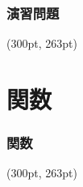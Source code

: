 \documentclass[dvipdfmx]{beamer}
\begin{document}
\begin{frame}[t, fragile]
    \frametitle{演習問題}
    \begin{textblock*}{0.3\linewidth}(300pt, 263pt)
    \space
    \end{textblock*}
\end{frame}

\section{関数}
\begin{frame}[t, fragile]
    \frametitle{関数}
    \tableofcontents[sections={2, 8}]
    \begin{textblock*}{0.3\linewidth}(300pt, 263pt)
    \space
    \end{textblock*}
\end{frame}
\end{document}
